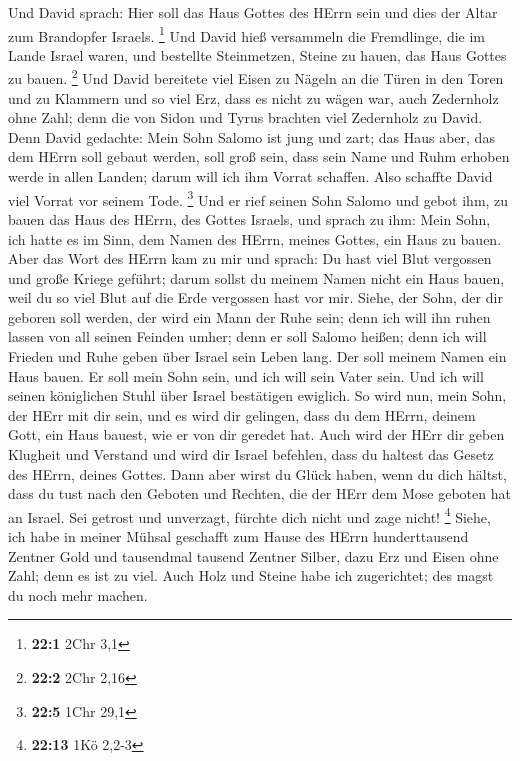  Und David sprach: Hier soll das Haus Gottes des HErrn sein
und dies der Altar zum Brandopfer Israels. \footnote{\textbf{22:1} 2Chr
  3,1}  Und David hieß versammeln die Fremdlinge, die im
Lande Israel waren, und bestellte Steinmetzen, Steine zu hauen, das Haus
Gottes zu bauen. \footnote{\textbf{22:2} 2Chr 2,16}  Und
David bereitete viel Eisen zu Nägeln an die Türen in den Toren und zu
Klammern und so viel Erz, dass es nicht zu wägen war,  auch
Zedernholz ohne Zahl; denn die von Sidon und Tyrus brachten viel
Zedernholz zu David.  Denn David gedachte: Mein Sohn Salomo
ist jung und zart; das Haus aber, das dem HErrn soll gebaut werden, soll
groß sein, dass sein Name und Ruhm erhoben werde in allen Landen; darum
will ich ihm Vorrat schaffen. Also schaffte David viel Vorrat vor seinem
Tode. \footnote{\textbf{22:5} 1Chr 29,1}  Und er rief seinen
Sohn Salomo und gebot ihm, zu bauen das Haus des HErrn, des Gottes
Israels,  und sprach zu ihm: Mein Sohn, ich hatte es im
Sinn, dem Namen des HErrn, meines Gottes, ein Haus zu bauen.
 Aber das Wort des HErrn kam zu mir und sprach: Du hast viel
Blut vergossen und große Kriege geführt; darum sollst du meinem Namen
nicht ein Haus bauen, weil du so viel Blut auf die Erde vergossen hast
vor mir.  Siehe, der Sohn, der dir geboren soll werden, der
wird ein Mann der Ruhe sein; denn ich will ihn ruhen lassen von all
seinen Feinden umher; denn er soll Salomo heißen; denn ich will Frieden
und Ruhe geben über Israel sein Leben lang.  Der soll
meinem Namen ein Haus bauen. Er soll mein Sohn sein, und ich will sein
Vater sein. Und ich will seinen königlichen Stuhl über Israel bestätigen
ewiglich.  So wird nun, mein Sohn, der HErr mit dir sein,
und es wird dir gelingen, dass du dem HErrn, deinem Gott, ein Haus
bauest, wie er von dir geredet hat.  Auch wird der HErr dir
geben Klugheit und Verstand und wird dir Israel befehlen, dass du
haltest das Gesetz des HErrn, deines Gottes.  Dann aber
wirst du Glück haben, wenn du dich hältst, dass du tust nach den Geboten
und Rechten, die der HErr dem Mose geboten hat an Israel. Sei getrost
und unverzagt, fürchte dich nicht und zage nicht! \footnote{\textbf{22:13}
  1Kö 2,2-3}  Siehe, ich habe in meiner Mühsal geschafft
zum Hause des HErrn hunderttausend Zentner Gold und tausendmal tausend
Zentner Silber, dazu Erz und Eisen ohne Zahl; denn es ist zu viel. Auch
Holz und Steine habe ich zugerichtet; des magst du noch mehr machen.
